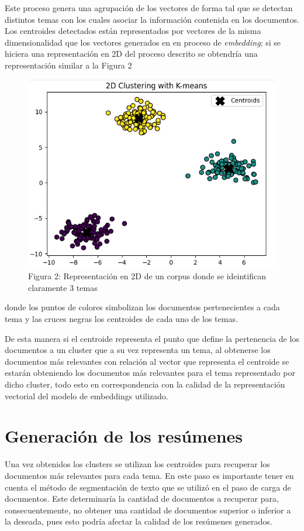     Este proceso genera una agrupación de los vectores de forma tal que se detectan distintos temas con los cuales asociar la información contenida en los documentos. Los centroides detectados están representados por vectores de la misma dimensionalidad que los vectores generados en en proceso de \emph{embedding}; si se hiciera una representación en 2D del proceso descrito se obtendría una representación similar a la Figura 2 
    \begin{figure}
        \centering
        \includegraphics[scale = 0.7]{Figures/clustering.png}
        \caption*{Figura 2: Representación en 2D de un corpus donde se ideintifican claramente 3 temas}
    \end{figure}
    donde los puntos de colores simbolizan los documentos pertenecientes a cada tema y las cruces negras los centroides de cada uno de los temas.

    De esta manera si el centroide representa el punto que define la pertenencia de los documentos a un cluster que a su vez representa un tema, al obtenerse los documentos más relevantes con relación al vector que representa el centroide se estarán obteniendo los documentos más relevantes para el tema representado por dicho cluster, todo esto en correspondencia con la calidad de la representación vectorial del modelo de embeddings utilizado.
\section{Generación de los resúmenes}
    Una vez obtenidos los clusters se utilizan los centroides para recuperar los documentos más relevantes para cada tema. En este paso es importante tener en cuenta el método de segmentación de texto que se utilizó en el paso de carga de documentos. Este determinaría la cantidad de documentos a recuperar para, consecuentemente, no obtener una cantidad de documentos superior o inferior a la deseada, pues esto podría afectar la calidad de los resúmenes generados.
    
